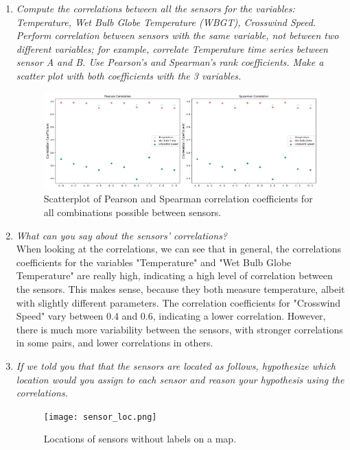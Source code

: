 \documentclass[a4paper,12pt]{article} %
\begin{document}
\begin{enumerate}
\item{\it Compute the correlations between all the sensors for the variables: Temperature, Wet Bulb Globe Temperature (WBGT), Crosswind Speed. Perform correlation between sensors with the same variable, not between two different variables; for example, correlate Temperature time series between sensor A and B. Use Pearson’s and Spearman’s rank coefficients. Make a scatter plot with both coefficients with the 3 variables.}
\begin{figure}[H] %
    \centering %
    \includegraphics[width=1\textwidth]{plot_correlations.png} 
    \caption{Scatterplot of Pearson and Spearman correlation coefficients for all combinations possible between sensors.} %
  \end{figure}
\item{\it What can you say about the sensors’ correlations?}
\\When looking at the correlations, we can see that in general, the correlations coefficients for the variables "Temperature" and "Wet Bulb Globe Temperature" are really high, indicating a high level of correlation between the sensors. This makes sense, because they both measure temperature, albeit with slightly different parameters. The correlation coefficients for "Crosswind Speed" vary between 0.4 and 0.6, indicating a lower correlation. However, there is much more variability between the sensors, with stronger correlations in some pairs, and lower correlations in others. 
\newpage
\item{\it If we told you that that the sensors are located as follows, hypothesize which location would you assign to each sensor and reason your hypothesis using the correlations.}
\begin{figure}[H] %
    \centering %
    \texttt{[image: sensor\_loc.png]} 
    \caption{Locations of sensors without labels on a map.} %
  \end{figure}

\end{enumerate}
\end{document}

